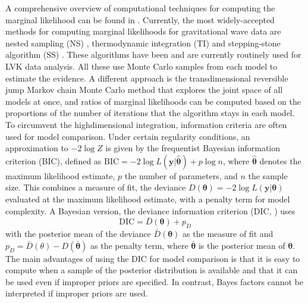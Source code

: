 \documentclass[%
 reprint,
 amsmath,amssymb,
 aps,
]{revtex4-2}
\def\btheta{\boldsymbol{\theta}}
\def\btheta{\boldsymbol{\theta}}
\def\ybold{\mathbf{y}}
\newcommand{\btheta}{\mbox{\boldmath $\theta$}}
\begin{document}
A comprehensive overview of computational techniques for computing the marginal likelihood can be found in
\cite{RobertCP2009CmfB, GelmanAndrew2014, ChristensenNelson2022Pewg}.
Currently, the most widely-accepted methods for computing marginal likelihoods for gravitational wave data are nested sampling (NS) \cite{skilling2006nested, veitch2010bayesian}, thermodynamic integration (TI) \cite{gelman1998simulating, lartillot2006computing} and stepping-stone algorithm (SS) \cite{xie2011improving, maturana2019stepping}. These algorithms have been and are currently routinely used for LVK data analysis. All these use Monte Carlo samples from each model to estimate the evidence. A different approach is the transdimensional reversible jump Markov chain Monte Carlo method \cite{green1995reversible, umstatter2005bayesian} that explores the joint space of all models at once, and ratios of marginal likelihoods can be computed based on the proportions of the number of iterations that the algorithm stays in each model.
To circumvent the highdimensional integration, information criteria are often used for model comparison.
Under certain regularity conditions, an approximation to $-2\log Z$ is given by the frequentist Bayesian information criterion (BIC), defined as $\mbox{BIC}=-2\log L(\ybold|\hat{\btheta}) +p\log n$,
where $\hat{\btheta}$ denotes the maximum likelihood estimate, $p$ the number of parameters, and $n$ the sample size. This combines a measure of fit, the deviance $D(\btheta)= -2\log L(\ybold|\btheta)$ evaluated at the maximum likelihood estimate, with a penalty term for model complexity. A Bayesian version, the deviance information criterion (DIC, \cite{spiegelhalter2002bayesian}) uses
\[\mbox{DIC}=\bar{D}(\btheta) +p_D \]
with the posterior mean of the deviance $\bar{D}(\btheta)$  as the measure of fit and $p_D=\bar{D}(\theta)-D(\bar{\btheta})$ as the penalty term, where $\bar{\btheta}$ is the posterior mean of $\btheta$. The main advantages of using the DIC for model comparison is that it is easy to compute when a sample of the posterior distribution is available and that it can be used even if improper priors are specified. In contrast, Bayes factors cannot be interpreted if improper priors are used.
\end{document}
